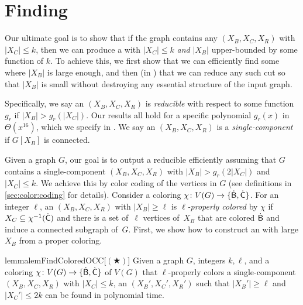 \section{Finding \Occs} \label{sec:find:occs}

Our ultimate goal is to show that if the graph contains any \tocc $(X_B,X_C,X_R)$ with $|X_C| \leq k$, 
then we can produce a \tocc with $|X_C| \leq k$ \emph{and} $|X_B|$ upper-bounded by some function of $k$.
To achieve this, we first show that we can efficiently find some \occ where $|X_B|$ is large enough, and then (in ) 
that we can reduce any such cut so that $|X_B|$ is small without destroying any essential structure of the input graph.

Specifically, we say an \occ $(X_B,X_C,X_R)$ is \emph{reducible} with respect to some function $g_r$ if $|X_B| > g_r(|X_C|)$. 
Our results all hold for a specific polynomial $g_r(x)$ in $\Theta(x^{16})$, which we specify in .
We say an \occ $(X_B,X_C,X_R)$ is a \emph{single-component} \occ if $G[X_B]$ is connected.


Given a graph $G$, our goal is to output a reducible \occ efficiently
assuming that $G$ contains a single-component \occ $(X_B, X_C, X_R)$
with $|X_B| > g_r(2 |X_C|)$ and~$|X_C| \leq k$.
%
We achieve this by color coding of the vertices in $G$ (see definitions in \cref{sec:color:coding} for details).
%
Consider a coloring $\chi\colon V(G) \to \{\mathsf{\dot{B}}, \mathsf{\dot{C}}\}$.
For an integer $\ell$,
an \occ $(X_B, X_C, X_R)$ with $|X_B| \geq \ell$
is \emph{$\ell$-properly colored} by $\chi$
if $X_C \subseteq \chi^{-1}(\mathsf{\dot{C}})$ and there is a set of~$\ell$ vertices of~$X_B$ that are colored $\mathsf{\dot{B}}$ and induce a connected subgraph of~$G$.
%
First, we show how to construct an \occ with large $X_B$ from a proper coloring.

\begin{restatable}{lemma}{lemFindColoredOCC}[$(\bigstar)$] \label{lem:finding-occ-colored}
  Given a graph $G$, integers $k, \ell$, and a coloring $\chi \colon V(G) \to \{\mathsf{\dot{B}}, \mathsf{\dot{C}}\}$ of $V(G)$ that $\ell$-properly colors
  a single-component \occ $(X_B, X_C, X_R)$ with $|X_C| \leq k$,
  an \occ $(X_B', X_C', X_R')$ such that $|X_B'| \geq \ell$ and $|X_C'| \leq 2k$
  can be found in polynomial time.
\end{restatable}


